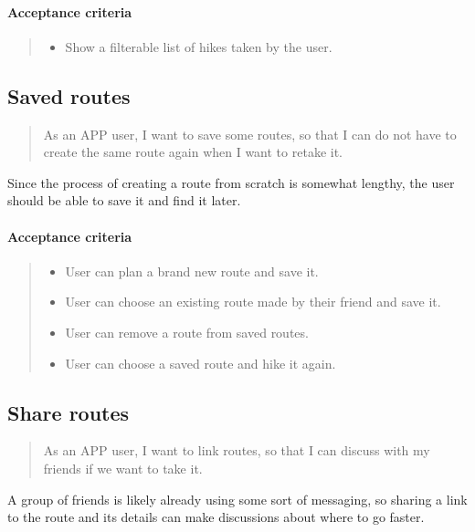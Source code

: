 \paragraph*{Acceptance criteria}
\begin{quote}
\begin{itemize}
    \item Show a filterable list of hikes taken by the user.
\end{itemize}
\end{quote}

\subsection{Saved routes}\label{US:map-saved}
\begin{quote}
As an APP user, I want to save some routes, so that I can do not have to create the same route again when I want to retake it.
\end{quote}

Since the process of creating a route from scratch is somewhat lengthy, the user should be able to save it and find it later.

\paragraph*{Acceptance criteria}
\begin{quote}
\begin{itemize}
    \item User can plan a brand new route and save it.
    \item User can choose an existing route made by their friend and save it.
    \item User can remove a route from saved routes.
    \item User can choose a saved route and hike it again.
\end{itemize}
\end{quote}

\subsection{Share routes}\label{US:map-share-route}
\begin{quote}
    As an APP user, I want to link routes, so that I can discuss with my friends if we want to take it.
\end{quote}

A group of friends is likely already using some sort of messaging, so sharing a link to the route and its details can make discussions about where to go faster.

